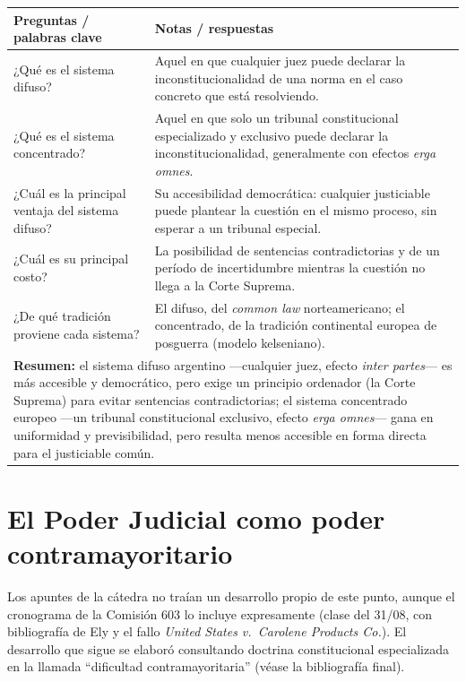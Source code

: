 \documentclass[12pt,oneside]{book}
\begin{document}
\begin{longtable}{@{}p{}p{}@{}}
\toprule
\textbf{Preguntas / palabras clave} & \textbf{Notas / respuestas} \\
\midrule
\endhead
¿Qué es el sistema difuso? & Aquel en que cualquier juez puede declarar la
inconstitucionalidad de una norma en el caso concreto que está resolviendo. \\
¿Qué es el sistema concentrado? & Aquel en que solo un tribunal constitucional
especializado y exclusivo puede declarar la inconstitucionalidad, generalmente con
efectos \textit{erga omnes}. \\
¿Cuál es la principal ventaja del sistema difuso? & Su accesibilidad democrática:
cualquier justiciable puede plantear la cuestión en el mismo proceso, sin esperar
a un tribunal especial. \\
¿Cuál es su principal costo? & La posibilidad de sentencias contradictorias y de
un período de incertidumbre mientras la cuestión no llega a la Corte Suprema. \\
¿De qué tradición proviene cada sistema? & El difuso, del \textit{common law}
norteamericano; el concentrado, de la tradición continental europea de posguerra
(modelo kelseniano). \\
\midrule
\multicolumn{2}{p{0.95\textwidth}}{\textbf{Resumen:} el sistema difuso argentino
—cualquier juez, efecto \textit{inter partes}— es más accesible y democrático,
pero exige un principio ordenador (la Corte Suprema) para evitar sentencias
contradictorias; el sistema concentrado europeo —un tribunal constitucional
exclusivo, efecto \textit{erga omnes}— gana en uniformidad y previsibilidad, pero
resulta menos accesible en forma directa para el justiciable común.} \\
\bottomrule
\end{longtable}

\chapter{El Poder Judicial como poder contramayoritario}
\label{cap:p4}

\begin{notebox}
Los apuntes de la cátedra no traían un desarrollo propio de este punto, aunque el
cronograma de la Comisión 603 lo incluye expresamente (clase del 31/08, con
bibliografía de Ely y el fallo \textit{United States v.\ Carolene Products Co.}).
El desarrollo que sigue se elaboró consultando doctrina constitucional especializada
en la llamada ``dificultad contramayoritaria'' (véase la bibliografía final).
\end{notebox}
\end{document}
